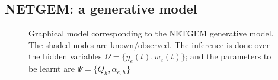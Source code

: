 \documentclass{bioinfo}
\begin{document}
\begin{methods}
\subsection{NETGEM: a generative model}
\label{sec:discussion-netgem}
\begin{figure}[htp]
  \centering
  \caption{Graphical model corresponding to the NETGEM generative
    model. The shaded nodes are known/observed. The inference is done
    over the hidden variables $\Omega = \{y_{e}(t), w_{e}(t)\}$; and the parameters to be learnt
    are $\Psi = \{Q_{h}, \alpha_{e,h}\}$ }
  \label{fig:netgem}
\end{figure}


\end{methods}
\end{document}
